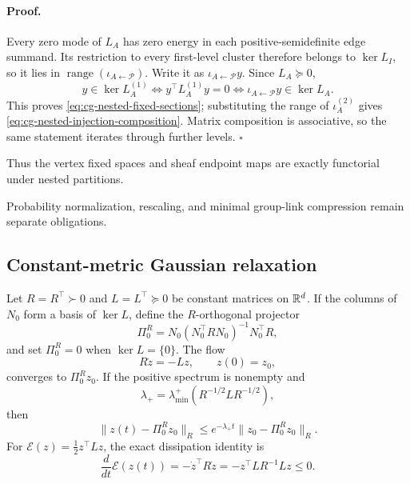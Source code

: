 \paragraph{Proof.}
Every zero mode of \(L_A\) has zero energy in each positive-semidefinite
edge summand. Its restriction to every first-level cluster therefore belongs
to \(\ker L_I\), so it lies in
\(\operatorname{range}(\iota_{A\leftarrow\mathcal P})\). Write it as
\(\iota_{A\leftarrow\mathcal P}y\). Since \(L_A\succeq0\),
\begin{equation}
y\in\ker L_A^{(1)}
\Longleftrightarrow
y^\top L_A^{(1)}y=0
\Longleftrightarrow
\iota_{A\leftarrow\mathcal P}y\in\ker L_A.
\label{eq:cg-nested-kernel-equivalence}
\end{equation}
This proves \eqref{eq:cg-nested-fixed-sections}; substituting the range of
\(\iota_A^{(2)}\) gives \eqref{eq:cg-nested-injection-composition}. Matrix
composition is associative, so the same statement iterates through further
levels. \(\square\)

Thus the vertex fixed spaces and sheaf endpoint maps are exactly functorial
under nested partitions. 

Probability normalization, rescaling, and minimal group-link compression remain
separate obligations. 

\subsection{Constant-metric Gaussian relaxation}
\label{sec:cg-gaussian-fixed-relaxation}

Let \(R=R^\top\succ0\) and \(L=L^\top\succeq0\) be constant matrices on
\(\mathbb R^d\). If the columns of \(N_0\) form a basis of \(\ker L\), define the
\(R\)-orthogonal projector
\begin{equation}
\Pi_0^R=N_0(N_0^\top RN_0)^{-1}N_0^\top R,
\label{eq:cg-r-projector}
\end{equation}
and set \(\Pi_0^R=0\) when \(\ker L=\{0\}\). The flow
\begin{equation}
R\dot z=-Lz,\qquad z(0)=z_0,
\label{eq:cg-constant-metric-flow}
\end{equation}
converges to \(\Pi_0^Rz_0\). If the positive spectrum is nonempty and
\begin{equation}
\lambda_+
=\lambda_{\min}^{+}(R^{-1/2}LR^{-1/2}),
\label{eq:cg-transverse-rate}
\end{equation}
then
\begin{equation}
\|z(t)-\Pi_0^Rz_0\|_R
\leq e^{-\lambda_+t}
\|z_0-\Pi_0^Rz_0\|_R.
\label{eq:cg-transverse-decay}
\end{equation}
For \(\mathcal E(z)=\tfrac12z^\top Lz\), the exact dissipation identity is
\begin{equation}
\frac{d}{dt}\mathcal E(z(t))
=-\dot z^\top R\dot z
=-z^\top LR^{-1}Lz\leq0.
\label{eq:cg-fixed-flow-dissipation}
\end{equation}

